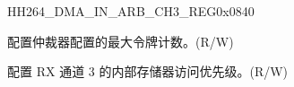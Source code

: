\begin{register}{H}{H264\_DMA\_IN\_ARB\_CH3\_REG}{0x0840}\label{regdesc:H264DMAINARBCH3REG}
%
%
%
%
\regnewline%
\begin{regdesc}\begin{reglist}
\label{fielddesc:H264DMAINARBTOKENNUMCH3}\item [H264\_DMA\_IN\_ARB\_TOKEN\_NUM\_CH3] 配置仲裁器配置的最大令牌计数。(R/W)
\label{fielddesc:H264DMAINTERINARBPRIORITYCH3}\item [H264\_DMA\_INTER\_IN\_ARB\_PRIORITY\_CH3] 配置 RX 通道 3 的内部存储器访问优先级。(R/W)
\end{reglist}\end{regdesc}
\end{register}




